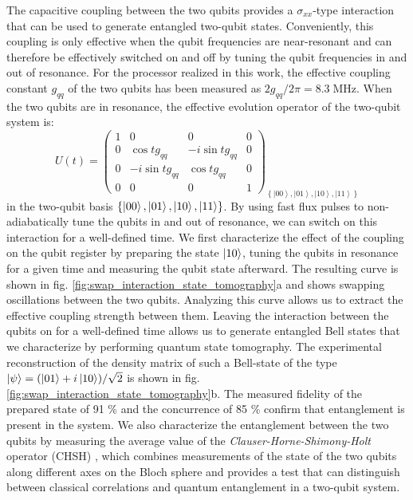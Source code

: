 The capacitive coupling between the two qubits provides a $\sigma_{xx}$-type
interaction that can be used to generate entangled two-qubit states.
Conveniently, this coupling is only effective when the qubit frequencies
are near-resonant and can therefore be effectively switched on and
off by tuning the qubit frequencies in and out of resonance. For the
processor realized in this work, the effective coupling constant $g_{qq}$
of the two qubits has been measured as $2g_{qq}/2\pi=8.3\;\mathrm{MHz}$.
When the two qubits are in resonance, the effective evolution operator
of the two-qubit system is:
%
\begin{equation}
U(t)=\left(\begin{array}{cccc}
1 & 0 & 0 & 0\\
0 & \cos{tg_{qq}} & -i\sin{tg_{qq}} & 0\\
0 & -i\sin{tg_{qq}} & \cos{tg_{qq}} & 0\\
0 & 0 & 0 & 1\end{array}\right)_{\left\{ \left|00\right\rangle ,\left|01\right\rangle ,\left|10\right\rangle ,\left|11\right\rangle \right\} } \label{eq:swap_evolution_operator}
\end{equation}
%
in the two-qubit basis $\{\left| 00 \right>,\left| 01 \right>,\left| 10 \right>,\left| 11 \right>\}$. By using fast flux pulses to non-adiabatically tune the qubits in
and out of resonance, we can switch on this interaction for a well-defined
time. We first characterize the effect of the coupling on the qubit
register by preparing the state $\left| 10 \right>$, tuning the qubits in
resonance for a given time and measuring the qubit state afterward.
The resulting curve is shown in fig. \ref{fig:swap_interaction_state_tomography}a
and shows swapping oscillations between the two qubits. Analyzing
this curve allows us to extract the effective coupling strength between
them. Leaving the interaction between the qubits on for a well-defined
time allows us to generate entangled Bell states that we characterize
by performing quantum state tomography. The experimental reconstruction
of the density matrix of such a Bell-state of the type $\left| \psi \right>=(\left| 01 \right>+i\left| 10 \right>)/\sqrt{2}$
is shown in fig. \ref{fig:swap_interaction_state_tomography}b.
The measured fidelity of the prepared state of 91 \% and the concurrence
of 85 \% confirm that entanglement is present in the system. We also
characterize the entanglement between the two qubits by measuring the average value of the \textit{Clauser-Horne-Shimony-Holt}
operator (CHSH) \citep{clauser_proposed_1969}, which
combines measurements of the state of the two qubits along different
axes on the Bloch sphere and provides a test that can distinguish
between classical correlations and quantum entanglement in a two-qubit
system.

